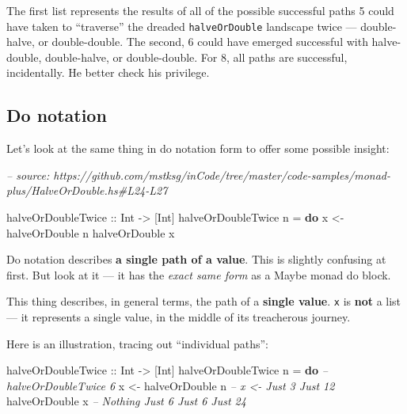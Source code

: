 \documentclass[]{article}
\newenvironment{Shaded}{}{}
\newcommand{\CommentTok}[1]{\textcolor[rgb]{0.38,0.63,0.69}{\textit{#1}}}
\newcommand{\DataTypeTok}[1]{\textcolor[rgb]{0.56,0.13,0.00}{#1}}
\newcommand{\FunctionTok}[1]{\textcolor[rgb]{0.02,0.16,0.49}{#1}}
\newcommand{\KeywordTok}[1]{\textcolor[rgb]{0.00,0.44,0.13}{\textbf{#1}}}
\newcommand{\NormalTok}[1]{#1}
\newcommand{\OtherTok}[1]{\textcolor[rgb]{0.00,0.44,0.13}{#1}}
\begin{document}
The first list represents the results of all of the possible successful paths 5
could have taken to ``traverse'' the dreaded \texttt{halveOrDouble} landscape
twice --- double-halve, or double-double. The second, 6 could have emerged
successful with halve-double, double-halve, or double-double. For 8, all paths
are successful, incidentally. He better check his privilege.

\hypertarget{do-notation}{%
\subsection{Do notation}\label{do-notation}}

Let's look at the same thing in do notation form to offer some possible insight:

\begin{Shaded}
\begin{Highlighting}[]
\CommentTok{-- source: https://github.com/mstksg/inCode/tree/master/code-samples/monad-plus/HalveOrDouble.hs#L24-L27}

\OtherTok{halveOrDoubleTwice ::} \DataTypeTok{Int} \OtherTok{->}\NormalTok{ [}\DataTypeTok{Int}\NormalTok{]}
\NormalTok{halveOrDoubleTwice n }\FunctionTok{=} \KeywordTok{do}
\NormalTok{    x }\OtherTok{<-}\NormalTok{ halveOrDouble n}
\NormalTok{    halveOrDouble x}
\end{Highlighting}
\end{Shaded}

Do notation describes \textbf{a single path of a value}. This is slightly
confusing at first. But look at it --- it has the \emph{exact same form} as a
Maybe monad do block.

This thing describes, in general terms, the path of a \textbf{single value}.
\texttt{x} is \textbf{not} a list --- it represents a single value, in the
middle of its treacherous journey.

Here is an illustration, tracing out ``individual paths'':

\begin{Shaded}
\begin{Highlighting}[]
\OtherTok{halveOrDoubleTwice ::} \DataTypeTok{Int} \OtherTok{->}\NormalTok{ [}\DataTypeTok{Int}\NormalTok{]}
\NormalTok{halveOrDoubleTwice n }\FunctionTok{=} \KeywordTok{do}       \CommentTok{-- halveOrDoubleTwice 6}
\NormalTok{    x }\OtherTok{<-}\NormalTok{ halveOrDouble n        }\CommentTok{-- x <-     Just 3          Just 12}
\NormalTok{    halveOrDouble x             }\CommentTok{--      Nothing  Just 6  Just 6  Just 24}
\end{Highlighting}
\end{Shaded}
\end{document}

